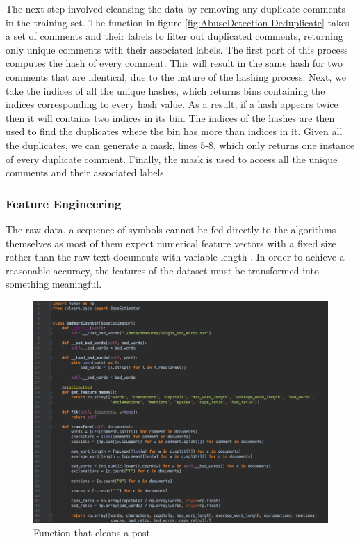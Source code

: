 The next step involved cleansing the data by removing any duplicate comments in the training set. The function in figure \ref{fig:AbuseDetection-Deduplicate} takes a set of comments and their labels to filter out duplicated comments, returning only unique comments with their associated labels. The first part of this process computes the hash of every comment. This will result in the same hash for two comments that are identical, due to the nature of the hashing process. Next, we take the indices of all the unique hashes, which returns bins containing the indices corresponding to every hash value. As a result, if a hash appears twice then it will contains two indices in its bin. The indices of the hashes are then used to find the duplicates where the bin has more than indices in it. Given all the duplicates, we can generate a mask, lines 5-8, which only returns one instance of every duplicate comment. Finally, the mask is used to access all the unique comments and their associated labels.

\subsubsection{Feature Engineering}
The raw data, a sequence of symbols cannot be fed directly to the algorithms themselves as most of them expect numerical feature vectors with a fixed size rather than the raw text documents with variable length \cite{scikit:tfidf}. In order to achieve a reasonable accuracy, the features of the dataset must be transformed into something meaningful.


\begin{figure}[H]
	\centering
	\includegraphics[width=\textwidth]{Images/Implementation/DataProcessing/AbuseDetection/BadWordCounter}
	\caption{Function that cleans a post}
	\label{fig:AbuseDetection-BadWordCounter}
\end{figure}

